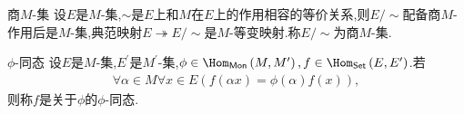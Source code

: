 \begin{proposition}{商$M$-集}{}
	设$E$是$M$-集,$\sim$是$E$上和$M$在$E$上的作用相容的等价关系,则$E/\sim$配备商$M$-作用后是$M$-集,典范映射$E\twoheadrightarrow E/\sim$是$M$-等变映射.称$E/\sim$为商$M$-集.
\end{proposition}

\begin{definition}{$\phi$-同态}{}
	设$E$是$M$-集,$E^{\prime}$是$M^{\prime}$-集,$\phi\in\Hom_{\mathsf{Mon}}\left(M,M^{\prime}\right),f\in\Hom_{\mathsf{Set}}\left(E,E^{\prime}\right)$.若
	\begin{align*}
		\forall\alpha\in M\forall x\in E\left(f\left(\alpha x\right)=\phi\left(\alpha\right)f\left(x\right)\right),
	\end{align*}
	则称$f$是关于$\phi$的$\phi$-同态.
\end{definition}



























































































